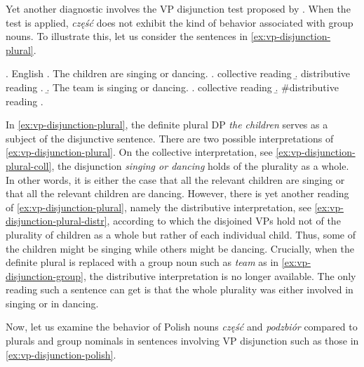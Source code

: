 Yet another diagnostic involves the VP disjunction test proposed by \citet[pp. 30--31]{de_vries2015shifting}. When the test is applied, \textit{część} does not exhibit the kind of behavior associated with group nouns. To illustrate this, let us consider the sentences in \ref{ex:vp-disjunction-plural}.

\ex. English \citep[p. 31; adapted]{de_vries2015shifting}
\a. The children are singing or dancing.\label{ex:vp-disjunction-plural}
\a. collective reading\label{ex:vp-disjunction-plural-coll}
\b. distributive reading\label{ex:vp-disjunction-plural-distr}
\z.
\b. The team is singing or dancing.\label{ex:vp-disjunction-group}
\a. collective reading\label{ex:vp-disjunction-group-coll}
\b. \#distributive reading\label{ex:vp-disjunction-group-distr}
\z.

In \ref{ex:vp-disjunction-plural}, the definite plural DP \textit{the children} serves as a subject of the disjunctive sentence. There are two possible interpretations of \ref{ex:vp-disjunction-plural}. On the collective interpretation, see \ref{ex:vp-disjunction-plural-coll}, the disjunction \textit{singing or dancing} holds of the plurality as a whole. In other words, it is either the case that all the relevant children are singing or that all the relevant children are dancing. However, there is yet another reading of \ref{ex:vp-disjunction-plural}, namely the distributive interpretation, see \ref{ex:vp-disjunction-plural-distr}, according to which the disjoined VPs hold not of the plurality of children as a whole but rather of each individual child. Thus, some of the children might be singing while others might be dancing. Crucially, when the definite plural is replaced with a group noun such as \textit{team} as in \ref{ex:vp-disjunction-group}, the distributive interpretation is no longer available. The only reading such a sentence can get is that the whole plurality was either involved in singing or in dancing.

Now, let us examine the behavior of Polish nouns \textit{część} and \textit{podzbiór} compared to plurals and group nominals in sentences involving VP disjunction such as those in \ref{ex:vp-disjunction-polish}. 
	
